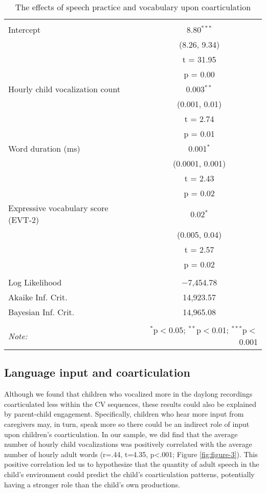 \documentclass[a4paper,man,natbib,donotrepeattitle, apacite]{apa6}
\begin{document}
\begin{table}[!htbp] \centering 
  \caption{The effects of speech practice and vocabulary upon coarticulation} 
  \label{tab:model-2} 
\begin{tabular}{@{\extracolsep{5pt}}lc} 
\\[-1.8ex]\hline 
\hline \\[-1.8ex] 
 Intercept & 8.80$^{***}$ \\ 
  & (8.26, 9.34) \\ 
  & t = 31.95 \\ 
  & p = 0.00 \\ 
  Hourly child vocalization count & 0.003$^{**}$ \\ 
  & (0.001, 0.01) \\ 
  & t = 2.74 \\ 
  & p = 0.01 \\ 
  Word duration (ms) & 0.001$^{*}$ \\ 
  & (0.0001, 0.001) \\ 
  & t = 2.43 \\ 
  & p = 0.02 \\ 
  Expressive vocabulary score (EVT-2) & 0.02$^{*}$ \\ 
  & (0.005, 0.04) \\ 
  & t = 2.57 \\ 
  & p = 0.02 \\ 
 \hline \\[-1.8ex] 
Log Likelihood & $-$7,454.78 \\ 
Akaike Inf. Crit. & 14,923.57 \\ 
Bayesian Inf. Crit. & 14,965.08 \\ 
\hline 
\hline \\[-1.8ex] 
\textit{Note:}  & \multicolumn{1}{r}{$^{*}$p$<$0.05; $^{**}$p$<$0.01; $^{***}$p$<$0.001} \\ 
\end{tabular} 
\end{table} 


\subsection{Language input and coarticulation}

Although we found that children who vocalized more in the daylong recordings coarticulated less within the CV sequences, these results could also be explained by parent-child engagement. Specifically, children who hear more input from caregivers may, in turn, speak more so there could be an indirect role of input upon children's coarticulation. In our sample, we did find that the average number of hourly child vocalizations was positively correlated with the average number of hourly adult words (r=.44, t=4.35, p<.001; Figure \ref{fig:figure-3}). This positive correlation led us to hypothesize that the quantity of adult speech in the child’s environment could predict the child’s coarticulation patterns, potentially having a stronger role than the child’s own productions.
\end{document}
